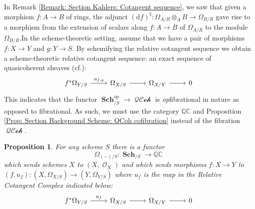 \documentclass{amsart}
\newtheorem{proposition}[equation]{Proposition}
\theoremstyle{definition}
\DeclareMathOperator{\Ocal}{\mathcal{O}}
\DeclareMathOperator{\op}{op}
\DeclareMathOperator{\Sch}{\mathbf{Sch}}
\DeclareMathOperator{\QQCoh}{\mathcal{QCoh}}
\newcommand{\Kah}[2]{\Omega_{{#1}/{#2}}}
\numberwithin{equation}{subsection}
\begin{document}
In Remark \ref{Remark: Section Kahlers: Cotangent sequence}, we saw that given a morphism $f:A \to B$ of rings, the adjunct $(\mathrm{d}f)^{\sharp}:\Kah{A}{R} \otimes_A B \to \Kah{B}{R}$ gave rise to a morphism from the extension of scalars along $f:A \to B$ of $\Kah{A}{R}$ to the module $\Kah{B}{R}$.In the scheme-theoretic setting, assume that we have a pair of morphisms $f:X \to Y$ and $g:Y \to S$. By schemifying the relative cotangent sequence we obtain a scheme-theoretic relative cotangent sequence: an exact sequence of quasicoherent sheaves (cf.\@ \cite[Corollaire 16.4.19]{EGA44}):
\[
\begin{tikzcd}
f^{\ast}\Kah{Y}{S} \ar[r]{}{u_{f,g}} &  \Kah{X}{S} \ar[r] & \Kah{X}{Y} \ar[r] & 0
\end{tikzcd}
\]
This indicates that the functor $\Sch_{/S}^{\op} \to \QQCoh$ is \emph{op}fibrational in nature as opposed to fibrational. As such, we must use the category $\mathbb{QC}$ and Proposition \ref{Prop: Section Background Scheme: QCoh cofibration} instead of the fibration $\QQCoh$.
\begin{proposition}\label{Prop: Section Kahlers: Functoriality of Kahlers for QCoh}
For any scheme $S$ there is a functor 
\[
\Kah{(-)}{S}:\Sch_{/S} \to \mathbb{QC}
\]
which sends schemes $X$ to $(X,\Ocal_X)$ and which sends morphisms $f:X \to Y$ to $(f,u_f):(X,\Kah{X}{S}) \to (Y,\Kah{Y}{S})$ where $u_f$ is the map in the Relative Cotangent Complex indicated below:
\[
\begin{tikzcd}
f^{\ast}\Kah{Y}{S} \ar[r]{}{u_f}  & \Kah{X}{S} \ar[r] & \Kah{X}{Y} \ar[r] & 0
\end{tikzcd}
\]
\end{proposition}
\end{document}
